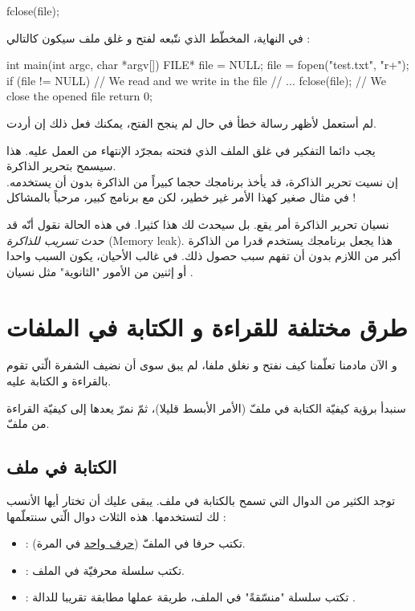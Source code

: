 \begin{Csource}
fclose(file);
\end{Csource}

في النهاية، المخطّط الذي نتّبعه لفتح و غلق ملف سيكون كالتالي :

\begin{Csource}
int main(int argc, char *argv[])
{
	FILE* file = NULL;
	file = fopen("test.txt", "r+");
	if (file != NULL)
	{
    		// We read and we write in the file
    		// ...
    		fclose(file); // We close the opened file
	}
	return 0;
}
\end{Csource}

لم أستعمل
لأظهر رسالة خطأ في حال لم ينجح الفتح، يمكنك فعل ذلك إن أردت.

يجب دائما التفكير في غلق الملف الذي فتحته بمجرّد الإنتهاء من العمل عليه. هذا سيسمح بتحرير الذاكرة.\\
إن نسيت تحرير الذاكرة، قد يأخذ برنامجك حجما كبيراً من الذاكرة بدون أن يستخدمه. في مثال صغير كهذا الأمر غير خطير، لكن مع برنامج كبير، مرحباً بالمشاكل !

نسيان تحرير الذاكرة أمر يقع. بل سيحدث لك هذا كثيرا. في هذه الحالة نقول أنّه قد حدث
\textit{تسريب للذاكرة} (\textenglish{Memory leak}).
هذا يجعل برنامجك يستخدم قدرا من الذاكرة أكبر من اللازم بدون أن تفهم سبب حصول ذلك. في غالب الأحيان، يكون السبب واحدا أو إثنين من الأمور "الثانوية" مثل نسيان
.

\section{طرق مختلفة للقراءة و الكتابة في الملفات}

و الآن مادمنا تعلّمنا كيف نفتح و نغلق ملفا، لم يبق سوى أن نضيف الشفرة الّتي تقوم بالقراءة و الكتابة عليه.

سنبدأ برؤية كيفيّة الكتابة في ملفّ (الأمر الأبسط قليلا)، ثمّ نمرّ يعدها إلى كيفيّة القراءة من ملفّ.

\subsection{الكتابة في ملف}

توجد الكثير من الدوال التي تسمح بالكتابة في ملف. يبقى عليك أن تختار أيها الأنسب لك لتستخدمها.
هذه الثلاث دوال الّتي سنتعلّمها :

\begin{itemize}
  \item {} :
  تكتب حرفا في الملفّ
  (\underline{حرف واحد}
  في المرة).
  \item {} :
تكتب سلسلة محرفيّة في الملف.
  \item {} :
تكتب سلسلة "منسّقةً" في الملف، طريقة عملها مطابقة تقريبا للدالة
.
\end{itemize}

